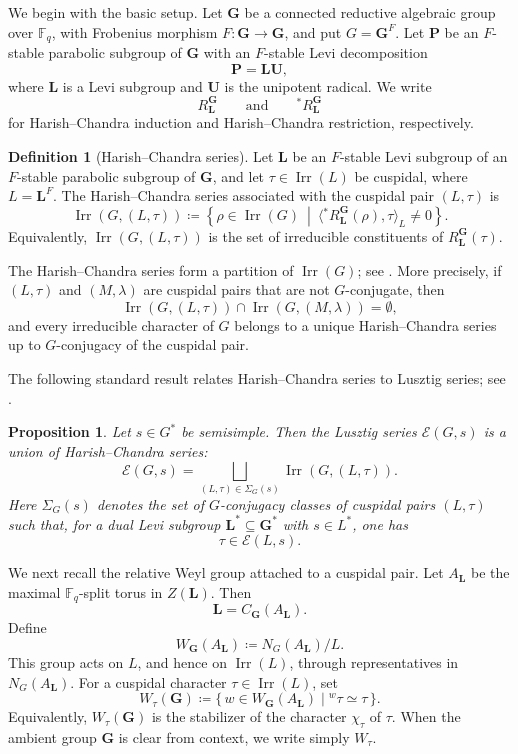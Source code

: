 \documentclass{amsart}
\theoremstyle{plain}
\numberwithin{equation}{section}
\newtheorem{proposition}[theorem]{Proposition}
\theoremstyle{definition}
\newtheorem{definition}[theorem]{Definition}
\newcommand{\cE}{\mathcal{E}}
\newcommand{\Irr}{\operatorname{Irr}}
\newcommand{\fq}{\mathbb{F}_{q}}
\newcommand{\bG}{\mathbf{G}}
\newcommand{\bL}{\mathbf{L}}
\newcommand{\bP}{\mathbf{P}}
\newcommand{\bU}{\mathbf{U}}
\begin{document}
We begin with the basic setup.  Let \(\bG\) be a connected reductive algebraic
group over \(\fq\), with Frobenius morphism \(F:\bG\to\bG\), and put
\(G=\bG^F\).  Let \(\bP\) be an \(F\)-stable parabolic subgroup of \(\bG\) with
an \(F\)-stable Levi decomposition
\[
\bP=\bL\bU,
\]
where \(\bL\) is a Levi subgroup and \(\bU\) is the unipotent radical.  We
write
\[
R_{\bL}^{\bG}
\qquad\text{and}\qquad
{}^*R_{\bL}^{\bG}
\]
for Harish--Chandra induction and Harish--Chandra restriction, respectively.

\begin{definition}[Harish--Chandra series]
Let \(\bL\) be an \(F\)-stable Levi subgroup of an \(F\)-stable parabolic
subgroup of \(\bG\), and let \(\tau\in\Irr(L)\) be cuspidal, where
\(L=\bL^F\).  The Harish--Chandra series associated with the cuspidal pair
\((L,\tau)\) is
\[
\Irr(G,(L,\tau))
\coloneqq
\left\{
\rho\in\Irr(G)
\ \middle|\
\big\langle {}^*R_{\bL}^{\bG}(\rho),\tau\big\rangle_L\neq 0
\right\}.
\]
Equivalently, \(\Irr(G,(L,\tau))\) is the set of irreducible constituents of
\(R_{\bL}^{\bG}(\tau)\).
\end{definition}

The Harish--Chandra series form a partition of \(\Irr(G)\); see
\cite[Corollary~3.1.17]{Book:GeckandMalle}.  More precisely, if
\((L,\tau)\) and \((M,\lambda)\) are cuspidal pairs that are not
\(G\)-conjugate, then
\[
\Irr(G,(L,\tau))\cap \Irr(G,(M,\lambda))=\emptyset,
\]
and every irreducible character of \(G\) belongs to a unique Harish--Chandra
series up to \(G\)-conjugacy of the cuspidal pair.

The following standard result relates Harish--Chandra series to Lusztig
series; see \cite[Corollary~3.3.21]{Book:DigneandMichel}.

\begin{proposition}
\label{prop:Lusztig-series-union-HC}
Let \(s\in G^*\) be semisimple.  Then the Lusztig series \(\cE(G,s)\) is a
union of Harish--Chandra series:
\[
\cE(G,s)
=
\bigsqcup_{(L,\tau)\in \Sigma_G(s)}
\Irr(G,(L,\tau)).
\]
Here \(\Sigma_G(s)\) denotes the set of \(G\)-conjugacy classes of cuspidal
pairs \((L,\tau)\) such that, for a dual Levi subgroup
\(\bL^*\subseteq\bG^*\) with \(s\in L^*\), one has
\[
\tau\in \cE(L,s).
\]
\end{proposition}

We next recall the relative Weyl group attached to a cuspidal pair.  Let
\(A_{\bL}\) be the maximal \(\fq\)-split torus in \(Z(\bL)\).  Then
\[
\bL=C_{\bG}(A_{\bL}).
\]
Define
\[
W_{\bG}(A_{\bL})
\coloneqq
N_G(A_{\bL})/L.
\]
This group acts on \(L\), and hence on \(\Irr(L)\), through representatives in
\(N_G(A_{\bL})\).  For a cuspidal character \(\tau\in\Irr(L)\), set
\[
W_{\tau}(\bG)
\coloneqq
\{\,w\in W_{\bG}(A_{\bL})\mid {}^w\tau\simeq \tau\,\}.
\]
Equivalently, \(W_{\tau}(\bG)\) is the stabilizer of the character
\(\chi_\tau\) of \(\tau\).  When the ambient group \(\bG\) is clear from
context, we write simply \(W_\tau\).
\end{document}
